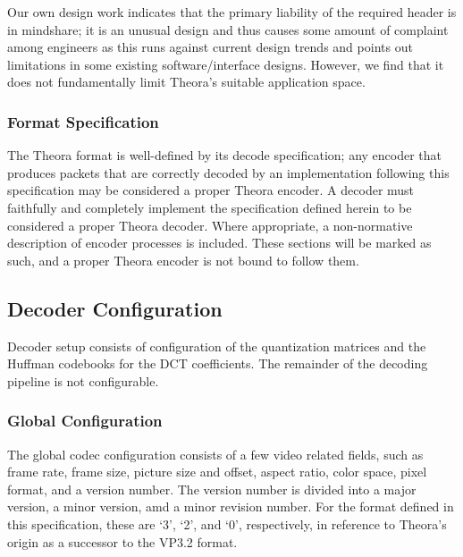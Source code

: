 \documentclass[11pt,letterpaper]{article}
\begin{document}
Our own design work indicates that the primary liability of the required header
 is in mindshare; it is an unusual design and thus causes some amount of
 complaint among engineers as this runs against current design trends and
 points out limitations in some existing software/interface designs.
However, we find that it does not fundamentally limit Theora's suitable
 application space.

\subsubsection{Format Specification}

The Theora format is well-defined by its decode specification; any encoder that
 produces packets that are correctly decoded by an implementation following
 this specification may be considered a proper Theora encoder.
A decoder must faithfully and completely implement the specification defined
 herein %
 to be considered a proper Theora decoder.
Where appropriate, a non-normative description of encoder processes is
 included.
These sections will be marked as such, and a proper Theora encoder is not
 bound to follow them.


\subsection{Decoder Configuration}

Decoder setup consists of configuration of the quantization matrices and the
 Huffman codebooks for the DCT coefficients.
The remainder of the decoding pipeline is not configurable.

\subsubsection{Global Configuration}

The global codec configuration consists of a few video related fields, such as
 frame rate, frame size, picture size and offset, aspect ratio, color space,
 pixel format, and a version number.
The version number is divided into a major version, a minor version, amd a
 minor revision number.
For the format defined in this specification, these are `3', `2', and
 `0', respectively, in reference to Theora's origin as a successor to the VP3.2
 format.
\end{document}
